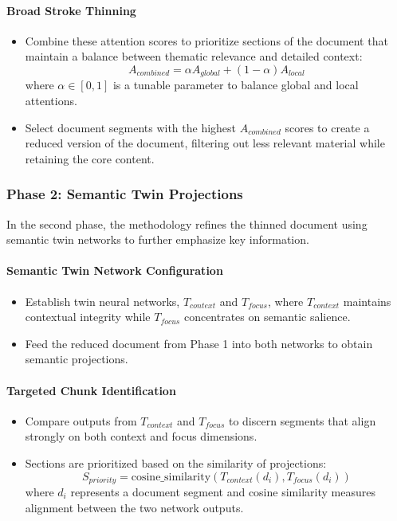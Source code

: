 \documentclass{article}
\theoremstyle{plain}
\theoremstyle{definition}
\theoremstyle{remark}
\begin{document}
\paragraph{Broad Stroke Thinning}
\begin{itemize}
\item Combine these attention scores to prioritize sections of the document that maintain a balance between thematic relevance and detailed context:
  $$
  A_{combined} = \alpha A_{global} + (1 - \alpha) A_{local}
  $$
  where $\alpha \in [0, 1]$ is a tunable parameter to balance global and local attentions.

\item Select document segments with the highest $A_{combined}$ scores to create a reduced version of the document, filtering out less relevant material while retaining the core content.
\end{itemize}

\subsubsection{Phase 2: Semantic Twin Projections}

In the second phase, the methodology refines the thinned document using semantic twin networks to further emphasize key information.

\paragraph{Semantic Twin Network Configuration}
\begin{itemize}

\item Establish twin neural networks, $T_{context}$ and $T_{focus}$, where $T_{context}$ maintains contextual integrity while $T_{focus}$ concentrates on semantic salience.
\item  Feed the reduced document from Phase 1 into both networks to obtain semantic projections.
\end{itemize}

\paragraph{Targeted Chunk Identification}
\begin{itemize}

\item Compare outputs from $T_{context}$ and $T_{focus}$ to discern segments that align strongly on both context and focus dimensions.

\item Sections are prioritized based on the similarity of projections:
  $$
  S_{priority} = \text{cosine\_similarity}(T_{context}(d_i), T_{focus}(d_i))
  $$
  where $d_i$ represents a document segment and cosine similarity measures alignment between the two network outputs.
\end{itemize}
\end{document}
